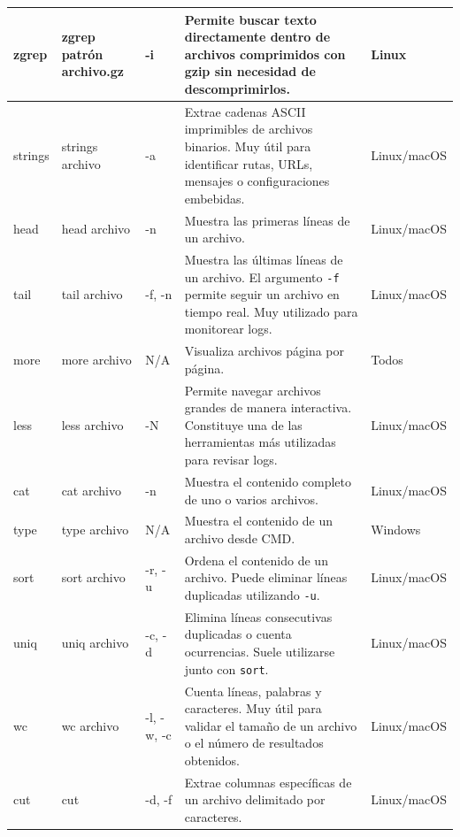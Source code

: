 \documentclass[a4paper,10pt]{article}
\begin{document}
\begin{longtable}{|p{2.8cm}|p{3cm}|p{4cm}|p{5.6cm}|p{1.5cm}|}
zgrep &
zgrep patrón archivo.gz &
-i &
Permite buscar texto directamente dentro de archivos comprimidos con gzip sin necesidad de descomprimirlos. &
Linux
\\
\hline

strings &
strings archivo &
-a &
Extrae cadenas ASCII imprimibles de archivos binarios. Muy útil para identificar rutas, URLs, mensajes o configuraciones embebidas. &
Linux/macOS
\\
\hline

head &
head archivo &
-n &
Muestra las primeras líneas de un archivo. &
Linux/macOS
\\
\hline

tail &
tail archivo &
-f, -n &
Muestra las últimas líneas de un archivo. El argumento \texttt{-f} permite seguir un archivo en tiempo real. Muy utilizado para monitorear logs. &
Linux/macOS
\\
\hline

more &
more archivo &
N/A &
Visualiza archivos página por página. &
Todos
\\
\hline

less &
less archivo &
-N &
Permite navegar archivos grandes de manera interactiva. Constituye una de las herramientas más utilizadas para revisar logs. &
Linux/macOS
\\
\hline

cat &
cat archivo &
-n &
Muestra el contenido completo de uno o varios archivos. &
Linux/macOS
\\
\hline

type &
type archivo &
N/A &
Muestra el contenido de un archivo desde CMD. &
Windows
\\
\hline

sort &
sort archivo &
-r, -u &
Ordena el contenido de un archivo. Puede eliminar líneas duplicadas utilizando \texttt{-u}. &
Linux/macOS
\\
\hline

uniq &
uniq archivo &
-c, -d &
Elimina líneas consecutivas duplicadas o cuenta ocurrencias. Suele utilizarse junto con \texttt{sort}. &
Linux/macOS
\\
\hline

wc &
wc archivo &
-l, -w, -c &
Cuenta líneas, palabras y caracteres. Muy útil para validar el tamaño de un archivo o el número de resultados obtenidos. &
Linux/macOS
\\
\hline

cut &
cut &
-d, -f &
Extrae columnas específicas de un archivo delimitado por caracteres. &
Linux/macOS
\\
\hline


\end{longtable}
\end{document}
